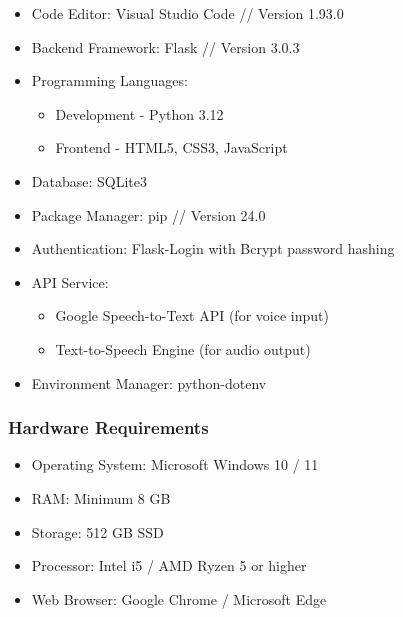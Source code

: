 \documentclass[12pt]{article}
\begin{document}
\begin{itemize}

\item Code Editor: Visual Studio Code // Version 1.93.0

\item Backend Framework: Flask // Version 3.0.3

\item Programming Languages:
    \begin{itemize}
        \item Development - Python 3.12
        \item Frontend - HTML5, CSS3, JavaScript
    \end{itemize}

\item Database: SQLite3

\item Package Manager: pip // Version 24.0

\item Authentication: Flask-Login with Bcrypt password hashing

\item API Service:
    \begin{itemize}
       
        \item Google Speech-to-Text API (for voice input)
        \item Text-to-Speech Engine (for audio output)
    \end{itemize}

\item Environment Manager: python-dotenv

\end{itemize}
\vspace{10pt}

\subsubsection{Hardware Requirements}

\begin{itemize}

\item Operating System: Microsoft Windows 10 / 11

\item RAM: Minimum 8 GB

\item Storage: 512 GB SSD

\item Processor: Intel i5 / AMD Ryzen 5 or higher

\item Web Browser: Google Chrome / Microsoft Edge

\end{itemize}
\end{document}
